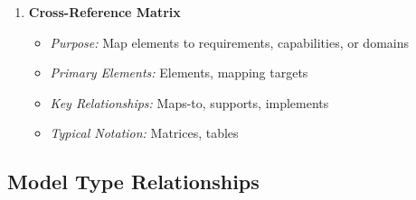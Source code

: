 \documentclass[11pt,letterpaper]{article}
\begin{document}
\begin{enumerate}[label=\textbf{MT\arabic*:}, leftmargin=2.5em]
    \item \textbf{Cross-Reference Matrix}
    \begin{itemize}[nosep]
        \item \textit{Purpose:} Map elements to requirements, capabilities, or domains
        \item \textit{Primary Elements:} Elements, mapping targets
        \item \textit{Key Relationships:} Maps-to, supports, implements
        \item \textit{Typical Notation:} Matrices, tables
    \end{itemize}
\end{enumerate}

\subsection{Model Type Relationships}
\end{document}
